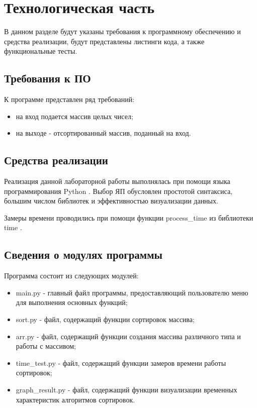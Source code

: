 \chapter{Технологическая часть}

В данном разделе будут указаны требования к программному обеспечению и средства реализации, будут представлены листинги кода, а также функциональные тесты.

\section{Требования к ПО}

К программе представлен ряд требований:

\begin{itemize}
	\item на вход подается массив целых чисел;
	\item на выходе - отсортированный массив, поданный на вход.
\end{itemize}

\section{Средства реализации}

Реализация данной лабораторной работы выполнялась при помощи языка программирования Python \cite{python}. Выбор ЯП обусловлен простотой синтаксиса, большим числом библиотек и эффективностью визуализации данных.

Замеры времени проводились при помощи функции process\_time из библиотеки time \cite{python-time}.

\section{Сведения о модулях программы}

Программа состоит из следующих модулей:

\begin{itemize}
	\item main.py - главный файл программы, предоставляющий пользователю меню для выполнения основных функций;
	\item sort.py - файл, содержащий функции сортировок массива;
	\item arr.py - файл, содержащий функции создания массива различного типа и работы с массивом;
	\item time\_test.py - файл, содержащий функции замеров времени работы сортировок;
	\item graph\_result.py - файл, содержащий функции визуализации временных характеристик алгоритмов сортировок.
\end{itemize}

